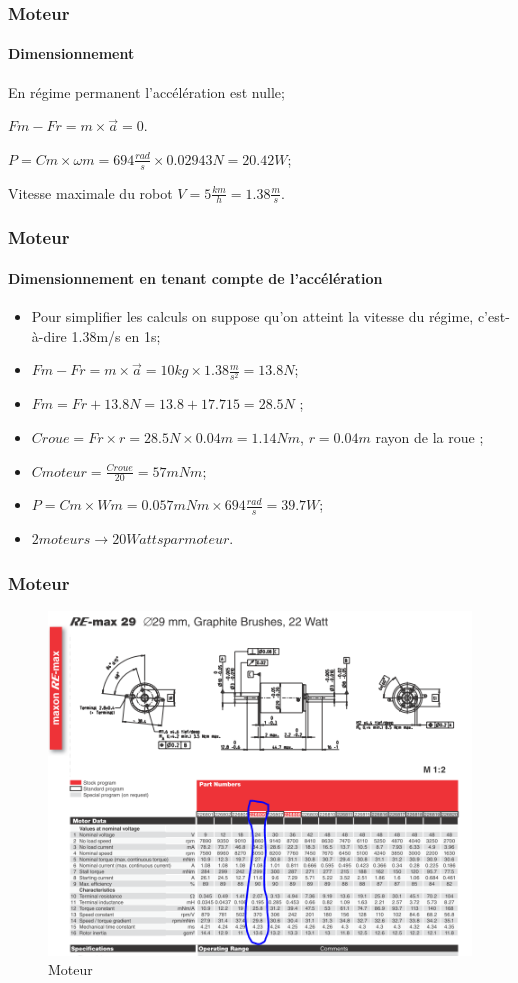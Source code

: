 \begin{frame}
\frametitle{Moteur}
\framesubtitle{Dimensionnement}
\begin{description}
\item[Régime permanent]
\item En régime permanent l'accélération est nulle;
\item $Fm - Fr = m \times \overrightarrow{a} = 0$.
\item[Résultats]
\item $P = Cm \times \omega m = 694\frac {rad}{s}  \times 0.02943N = 20.42W$;
\item Vitesse maximale du robot $V = 5\frac{km}{h} = 1.38\frac{m}{s}$.
\end{description}
\end{frame}

\begin{frame}
\frametitle{Moteur}
\framesubtitle{Dimensionnement en tenant compte de l'accélération}
\begin{itemize}
\item Pour simplifier les calculs on suppose qu'on atteint la vitesse du régime, c'est-à-dire 1.38m/s en 1s;
\item $Fm - Fr = m \times \overrightarrow{a} = 10kg \times 1.38\frac{m}{s^{2}} = 13.8N$;
\item $Fm = Fr + 13.8N = 13.8 + 17.715 = 28.5N$ ;
\item $Croue = Fr \times r = 28.5N  \times 0.04m = 1.14Nm$, $r = 0.04m$ rayon de la roue ;
\item $Cmoteur = \frac {Croue}{20} = 57mNm$;
\item $P = Cm \times Wm = 0.057mNm \times 694\frac{rad}{s} = 39.7W$;
\item $2 moteurs \rightarrow 20 Watts par moteur$.
\end{itemize}
\end{frame}

\begin{frame}
\frametitle{Moteur}
\begin{figure}[!ht]
	\centering
	\includegraphics[scale=0.7]{Moteur.PNG}
	\caption{Moteur}
\end{figure}
\end{frame}


